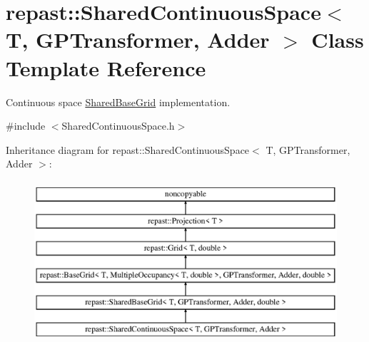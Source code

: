 \hypertarget{classrepast_1_1_shared_continuous_space}{\section{repast\-:\-:Shared\-Continuous\-Space$<$ T, G\-P\-Transformer, Adder $>$ Class Template Reference}
\label{classrepast_1_1_shared_continuous_space}
}


Continuous space \hyperlink{classrepast_1_1_shared_base_grid}{Shared\-Base\-Grid} implementation.  




{\ttfamily \#include $<$Shared\-Continuous\-Space.\-h$>$}

Inheritance diagram for repast\-:\-:Shared\-Continuous\-Space$<$ T, G\-P\-Transformer, Adder $>$\-:\begin{figure}[H]
\begin{center}
\leavevmode
\includegraphics[height=6.000000cm]{classrepast_1_1_shared_continuous_space}
\end{center}
\end{figure}
